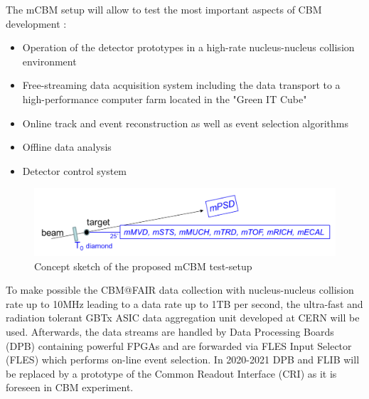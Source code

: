 \documentclass[a4paper,11pt]{article}
\begin{document}
The mCBM setup will allow to test the most important aspects of CBM development \cite{2}:
\begin{itemize}
	\item Operation of the detector prototypes in a high-rate nucleus-nucleus collision environment
	\item Free-streaming data acquisition system including the data transport to a high-performance computer farm located in the "Green IT Cube"
	\item Online track and event reconstruction as well as event selection algorithms
	\item Offline data analysis
	\item Detector control system
\end{itemize}

\begin{figure}[htbp]
	\centering 
	\includegraphics[width=.8\textwidth]{mCBM_sketch.png}
	\caption{\label{fig:1} Concept sketch of the proposed mCBM test-setup}
\end{figure}

To make possible the CBM@FAIR data collection with nucleus-nucleus collision rate up to 10MHz leading to a data rate up to 1TB per second, the ultra-fast and radiation tolerant GBTx ASIC data aggregation unit developed at CERN will be used. Afterwards, the data streams are handled by Data Processing Boards (DPB) containing powerful FPGAs and are forwarded via FLES Input Selector (FLES) which performs on-line event selection. In 2020-2021 DPB and FLIB will be replaced by a prototype of the Common Readout Interface (CRI) as it is foreseen in CBM experiment.
\end{document}
